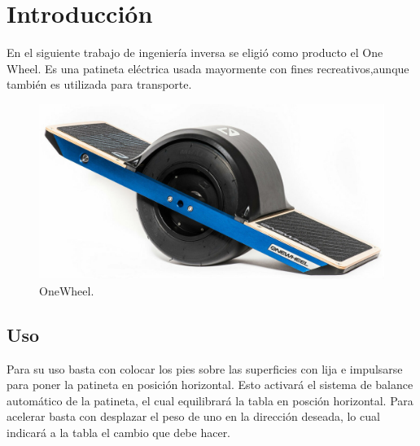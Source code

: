 







\tableofcontents
\newpage



\section{Introducci\'on}

En el siguiente trabajo de ingenier\'ia inversa se eligi\'o como producto el One Wheel.
Es una patineta el\'ectrica usada mayormente con fines recreativos,aunque tambi\'en es utilizada para transporte.
\begin{figure}[H]
	\center
	\includegraphics[width=0.6\linewidth, page=1]{Imagenes/onewheel}
	\caption{OneWheel.}
	\label{fig:intro:OneWheel}
\end{figure}
\subsection{Uso}
Para su uso basta con colocar los pies sobre las superficies con lija e impulsarse para poner la patineta en posición horizontal. Esto activar\'a el sistema de balance autom\'atico de la patineta, el cual equilibrar\'a la tabla en posci\'on horizontal. Para acelerar basta con desplazar el peso de uno en la dirección deseada, lo cual indicar\'a a la tabla el cambio que debe hacer.
